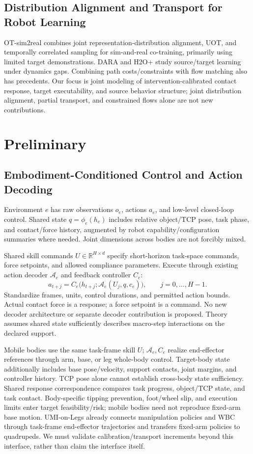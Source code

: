 \documentclass[11pt]{article}
\newcommand{\R}{\mathbb R}
\begin{document}
\subsection{Distribution Alignment and Transport for Robot Learning}
OT-sim2real combines joint representation-distribution alignment, UOT, and temporally correlated sampling for sim-and-real co-training, primarily using limited target demonstrations\cite{otreal}. DARA and H2O+ study source/target learning under dynamics gaps\cite{dara,h2oplus}. Combining path costs/constraints with flow matching also has precedents\cite{densityflow}. Our focus is joint modeling of intervention-calibrated contact response, target executability, and source behavior structure; joint distribution alignment, partial transport, and constrained flows alone are not new contributions.

\section{Preliminary}
\label{sec:prelim}
\subsection{Embodiment-Conditioned Control and Action Decoding}
Environment $e$ has raw observations $o_e$, actions $a_e$, and low-level closed-loop control. Shared state $q=\phi_e(h_e)$ includes relative object/TCP pose, task phase, and contact/force history, augmented by robot capability/configuration summaries where needed. Joint dimensions across bodies are not forcibly mixed.

Shared skill commands $U\in\R^{H\times d}$ specify short-horizon task-space commands, force setpoints, and allowed compliance parameters. Execute through existing action decoder $\mathcal A_e$ and feedback controller $C_e$:
\begin{equation}
 a_{t+j}=C_e\big(h_{t+j};\mathcal A_e(U_j,q,c_e)\big),
 \qquad j=0,\ldots,H-1.
 \label{eq:decode}
\end{equation}
Standardize frames, units, control durations, and permitted action bounds. Actual contact force is a response; a force setpoint is a command. No new decoder architecture or separate decoder contribution is proposed. Theory assumes shared state sufficiently describes macro-step interactions on the declared support.

Mobile bodies use the same task-frame skill $U$; $\mathcal A_e,C_e$ realize end-effector references through arm, base, or leg whole-body control. Target-body state additionally includes base pose/velocity, support contacts, joint margins, and controller history. TCP pose alone cannot establish cross-body state sufficiency. Shared response correspondence compares task progress, object/TCP state, and task contact. Body-specific tipping prevention, foot/wheel slip, and execution limits enter target feasibility/risk; mobile bodies need not reproduce fixed-arm base motion. UMI-on-Legs already connects manipulation policies and WBC through task-frame end-effector trajectories and transfers fixed-arm policies to quadrupeds. We must validate calibration/transport increments beyond this interface, rather than claim the interface itself\cite{umilegs}.
\end{document}
